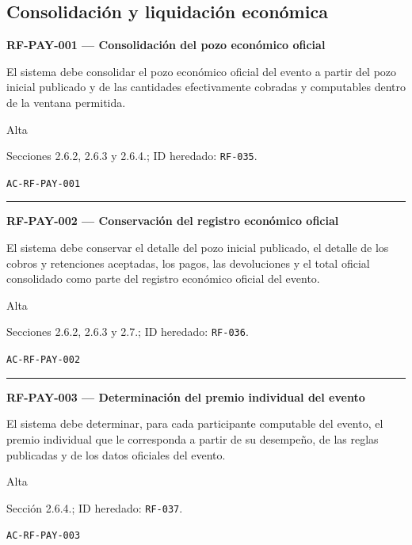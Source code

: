 \documentclass[10pt,letterpaper]{article}
\begin{document}
\subsection{Consolidación y liquidación económica}
\noindent\textbf{RF-PAY-001 --- Consolidación del pozo económico oficial}\par
\begin{description}[style=nextline,leftmargin=3.15cm,labelwidth=2.8cm,font=\normalfont\bfseries]
\item[Obligación] El sistema debe consolidar el pozo económico oficial del evento a partir del pozo inicial publicado y de las cantidades efectivamente cobradas y computables dentro de la ventana permitida.
\item[Prioridad] Alta
\item[Procedencia] Secciones 2.6.2, 2.6.3 y 2.6.4.; ID heredado: \texttt{RF-035}.
\item[Verificación] \texttt{AC-RF-PAY-001}
\end{description}
\vspace{0.25em}\hrule\vspace{0.65em}
\noindent\textbf{RF-PAY-002 --- Conservación del registro económico oficial}\par
\begin{description}[style=nextline,leftmargin=3.15cm,labelwidth=2.8cm,font=\normalfont\bfseries]
\item[Obligación] El sistema debe conservar el detalle del pozo inicial publicado, el detalle de los cobros y retenciones aceptadas, los pagos, las devoluciones y el total oficial consolidado como parte del registro económico oficial del evento.
\item[Prioridad] Alta
\item[Procedencia] Secciones 2.6.2, 2.6.3 y 2.7.; ID heredado: \texttt{RF-036}.
\item[Verificación] \texttt{AC-RF-PAY-002}
\end{description}
\vspace{0.25em}\hrule\vspace{0.65em}
\noindent\textbf{RF-PAY-003 --- Determinación del premio individual del evento}\par
\begin{description}[style=nextline,leftmargin=3.15cm,labelwidth=2.8cm,font=\normalfont\bfseries]
\item[Obligación] El sistema debe determinar, para cada participante computable del evento, el premio individual que le corresponda a partir de su desempeño, de las reglas publicadas y de los datos oficiales del evento.
\item[Prioridad] Alta
\item[Procedencia] Sección 2.6.4.; ID heredado: \texttt{RF-037}.
\item[Verificación] \texttt{AC-RF-PAY-003}
\end{description}
\end{document}

